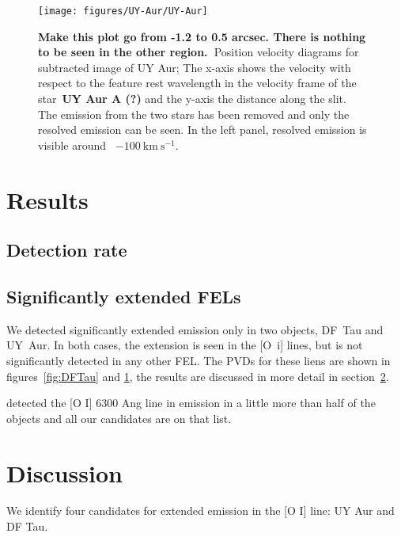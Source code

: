 \documentclass[twocolumn]{aastex62}
\begin{document}
\begin{figure}[h!]
\begin{center}
\texttt{[image: figures/UY-Aur/UY-Aur]}
\caption{\textbf{Make this plot go from -1.2 to 0.5 arcsec. There is nothing to
be seen in the other region.~}Position velocity diagrams for subtracted
image of UY Aur; The x-axis shows the velocity with respect to the
feature rest wavelength in the velocity frame of the star~\textbf{UY Aur
A (?)} and the y-axis the distance along the slit.~ The emission from
the two stars has been removed and only the resolved emission can be
seen. In the left panel, resolved emission is visible around~
\(-100\ \mathrm{km\ s^{-1}}\).
\label{fig:UYAur}
}
\end{center}
\end{figure}

\section{Results}
\label{sect:results}


\subsection{Detection rate}

\subsection{Significantly extended FELs}
We detected significantly extended emission only in two objects, DF~Tau and UY~Aur. In both cases, the extension is seen in the [O~{\sc i}] lines, but is not significantly detected in any other FEL. The PVDs for these liens are shown in figures~\ref{fig:DFTau} and \ref{fig:UYAur}, the results are discussed in more detail in section~\ref{sect:discussion}.

\citet{2003ApJ...583..334H} detected the {[}O I{]} 6300 Ang line in emission in
a little more than half of the objects and all our candidates are on
that list.






\section{Discussion}
\label{sect:discussion}

We identify four candidates for extended emission in the {[}O I{]} line:
UY Aur and DF Tau.
\end{document}
